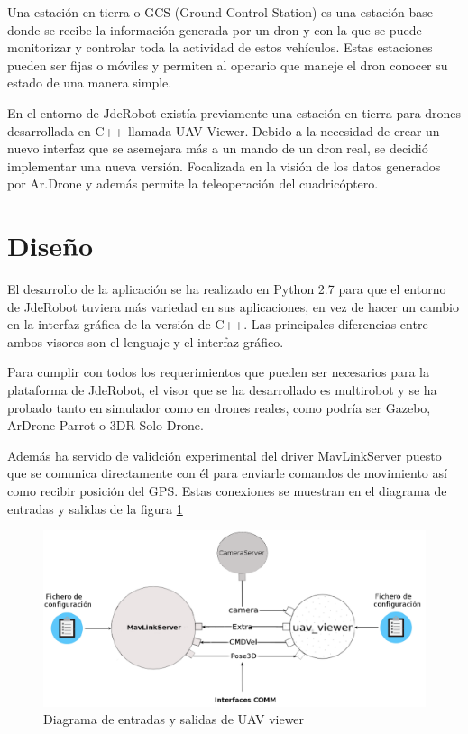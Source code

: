 \label{visor uavViewer}

Una estación en tierra o GCS (Ground Control Station) es una estación base donde se recibe la
información generada por un dron y con la que se puede monitorizar y controlar toda la actividad
de estos vehículos. Estas estaciones pueden ser fijas o móviles y permiten al operario que maneje el dron
conocer su estado de una manera simple.

En el entorno de JdeRobot existía previamente una estación en tierra para drones desarrollada en C++ llamada UAV-Viewer. Debido a la necesidad de crear un nuevo interfaz que se asemejara más a un mando de un dron real, se decidió implementar una nueva versión. Focalizada en la visión de los datos generados por Ar.Drone y además permite la teleoperación del cuadricóptero. 

\section{Diseño}

El desarrollo de la aplicación se ha realizado en Python 2.7 para que el entorno de JdeRobot tuviera más variedad en sus aplicaciones, en vez de hacer un cambio en la interfaz gráfica de la versión de C++. Las principales diferencias entre ambos visores son el lenguaje y el interfaz gráfico. 

Para cumplir con todos los requerimientos que pueden ser necesarios para la plataforma de JdeRobot, el visor que se ha desarrollado es multirobot y se ha probado tanto en simulador como en drones reales, como podría ser Gazebo, ArDrone-Parrot o 3DR Solo Drone.

Además ha servido de validción experimental del driver MavLinkServer puesto que se comunica directamente con él para enviarle comandos de movimiento así como recibir posición del GPS. Estas conexiones se muestran en el diagrama de entradas y salidas de la figura \ref{fig:esquemaUav}

\begin{figure}[H]
  \centering
  \includegraphics[scale=0.4]{imagenes/MapaGeneral.png}
  \caption{Diagrama de entradas y salidas de UAV viewer}
  \label{fig:esquemaUav}
\end{figure}

